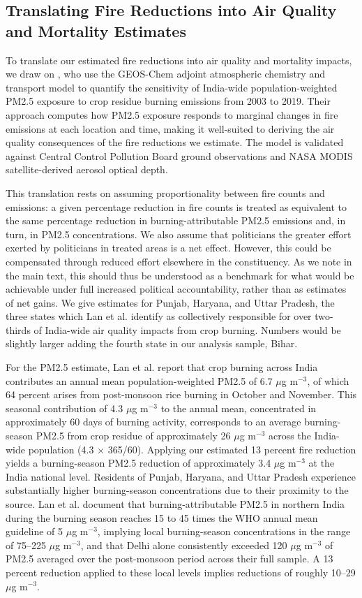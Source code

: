 \documentclass[12pt]{article}
\begin{document}
{%
\FloatBarrier
\subsection{Translating Fire Reductions into Air Quality and Mortality Estimates}\label{sec:mortality_estimates}

To translate our estimated fire reductions into air quality and mortality impacts, we draw on \citet{lan2022air}, who use the GEOS-Chem adjoint atmospheric chemistry and transport model to quantify the sensitivity of India-wide population-weighted PM2.5 exposure to crop residue burning emissions from 2003 to 2019. Their approach computes how PM2.5 exposure responds to marginal changes in fire emissions at each location and time, making it well-suited to deriving the air quality consequences of the fire reductions we estimate. The model is validated against Central Control Pollution Board ground observations and NASA MODIS satellite-derived aerosol optical depth. 

This translation rests on assuming proportionality between fire counts and emissions: a given percentage reduction in fire counts is treated as equivalent to the same percentage reduction in burning-attributable PM2.5 emissions and, in turn, in PM2.5 concentrations. We also assume that politicians the greater effort exerted by politicians in treated areas is a net effect. However, this could be compensated through reduced effort elsewhere in the constituency. As we note in the main text, this should thus be understood as a benchmark for what would be achievable under full increased political accountability, rather than as estimates of  net gains. We give estimates for Punjab, Haryana, and Uttar Pradesh, the three states which Lan et al. identify as collectively responsible for over two-thirds of India-wide air quality impacts from crop burning. Numbers would be slightly larger adding the fourth state in our analysis sample, Bihar.

For the PM2.5 estimate, Lan et al. report that crop burning across India contributes an annual mean population-weighted PM2.5 of 6.7 $\mu$g m$^{-3}$, of which 64 percent arises from post-monsoon rice burning in October and November. This seasonal contribution of 4.3 $\mu$g m$^{-3}$ to the annual mean, concentrated in approximately 60 days of burning activity, corresponds to an average burning-season PM2.5 from crop residue of approximately 26 $\mu$g m$^{-3}$ across the India-wide population (4.3 × 365/60). Applying our estimated 13 percent fire reduction yields a burning-season PM2.5 reduction of approximately 3.4 $\mu$g m$^{-3}$ at the India national level. Residents of Punjab, Haryana, and Uttar Pradesh experience substantially higher burning-season concentrations due to their proximity to the source. Lan et al. document that burning-attributable PM2.5 in northern India during the burning season reaches 15 to 45 times the WHO annual mean guideline of 5 $\mu$g m$^{-3}$, implying local burning-season concentrations in the range of 75–225 $\mu$g m$^{-3}$, and that Delhi alone consistently exceeded 120 $\mu$g m$^{-3}$ of PM2.5 averaged over the post-monsoon period across their full sample. A 13 percent reduction applied to these local levels implies reductions of roughly 10–29 $\mu$g m$^{-3}$. 

}
\end{document}
